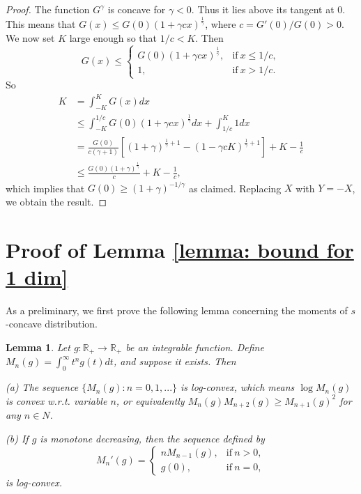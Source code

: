\documentclass[11pt]{article}
\newcommand{\R}{\mathbb{R}}
\newtheorem{lemma}[theorem]{Lemma}
\begin{document}
{{{{\begin{proof}
The function $G^\gamma$ is concave for $\gamma<0$. Thus it lies above its tangent at $0$. This means that $G(x)\le G(0)(1+\gamma cx)^\frac{1}{\gamma}$, where $c=G'(0)/G(0)>0$. We now set $K$ large enough so that $1/c<K$. Then
\begin{equation*}
G(x)\le
\begin{cases}
G(0)(1+\gamma cx)^\frac{1}{\gamma}, & \mbox{if}\ x\le 1/c,\\
1, & \mbox{if}\ x> 1/c.
\end{cases}
\end{equation*}
So
\begin{equation*}
\begin{split}
K&=\int_{-K}^KG(x)dx\\
&\le \int_{-K}^{1/c}G(0)(1+\gamma cx)^\frac{1}{\gamma}dx+\int_{1/c}^K1dx\\
&=\frac{G(0)}{c(\gamma+1)}[(1+\gamma)^{\frac{1}{\gamma}+1}-(1-\gamma cK)^{\frac{1}{\gamma}+1}]+K-\frac{1}{c}\\
&\le\frac{G(0)(1+\gamma)^{\frac{1}{\gamma}}}{c}+K-\frac{1}{c},
\end{split}
\end{equation*}
which implies that $G(0)\ge (1+\gamma)^{-1/\gamma}$ as claimed. Replacing $X$ with $Y=-X$, we obtain the result.
\end{proof}


\section{Proof of Lemma \ref{lemma: bound for 1 dim}}
As a preliminary, we first prove the following lemma concerning the moments of $s$-concave distribution.
\begin{lemma}
\label{lemma: moment property}
Let $g:\R_+\rightarrow\R_+$ be an integrable function. Define
$M_n(g)=\int_0^\infty t^ng(t)dt$,
and suppose it exists.
Then

(a) The sequence $\{M_n(g): n=0,1,...\}$ is log-convex, which means $\log M_n(g)$ is convex w.r.t. variable $n$, or equivalently $M_n(g)M_{n+2}(g)\ge M_{n+1}(g)^2$ for any $n\in N$.

(b) If $g$ is monotone decreasing, then the sequence defined by
\begin{equation*}
M_n'(g)=
\begin{cases}
nM_{n-1}(g), & \mbox{if}\ n>0,\\
g(0), & \mbox{if}\ n=0,
\end{cases}
\end{equation*}
is log-convex.


\end{lemma}}}}}
\end{document}

